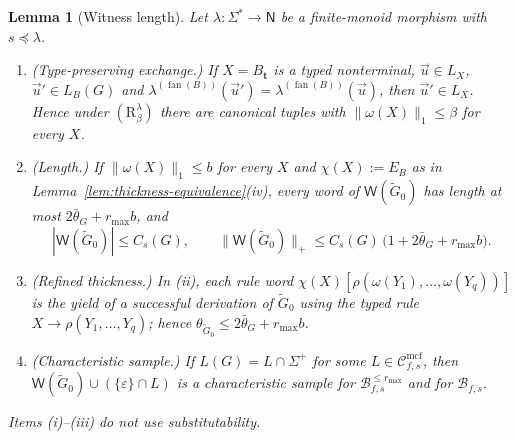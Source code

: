 \documentclass[11pt]{article}
\numberwithin{equation}{section}
\theoremstyle{plain}
\newtheorem{lemma}[theorem]{Lemma}
\theoremstyle{definition}
\theoremstyle{remark}
\newcommand{\Wit}{\mathsf{W}}
\newcommand{\Cmcf}[2]{\mathcal{C}^{\mathrm{mcf}}_{#1,#2}}
\newcommand{\tuple}[1]{\vec{#1}}
\newcommand{\eps}{\varepsilon}
\newcommand{\fan}{\operatorname{fan}}
\begin{document}
\begin{lemma}[Witness length]
\label{lem:witness-length-template}
\label{lem:type-preserving-replacement}
Let $\lambda:\Sigma^*\to\mathsf N$ be a finite-monoid morphism with $s\preceq\lambda$.
\begin{enumerate}[label=\textup{(\roman*)},leftmargin=*]
\item \emph{(Type-preserving exchange.)}  If $X=B_{\mathbf t}$ is a typed
nonterminal, $\tuple u\in L_X$, $\tuple u'\in L_B(G)$ and
$\lambda^{(\fan(B))}(\tuple u')=\lambda^{(\fan(B))}(\tuple u)$, then
$\tuple u'\in L_X$.  Hence under $(\mathrm R_\beta^\lambda)$ there are canonical
tuples with $\|\omega(X)\|_1\le\beta$ for every $X$.
\item \emph{(Length.)}  If $\|\omega(X)\|_1\le b$ for every $X$ and
$\chi(X):=E_B$ as in Lemma~\ref{lem:thickness-equivalence}(iv), every word of
$\Wit(\widetilde G_0)$ has length at most $2\bar\theta_G+r_{\max}b$, and
\[
 |\Wit(\widetilde G_0)|\le C_s(G),\qquad
 \|\Wit(\widetilde G_0)\|_+\le C_s(G)\,\bigl(1+2\bar\theta_G+r_{\max}b\bigr).
\]
\item \emph{(Refined thickness.)}  In (ii), each rule word
$\chi(X)[\rho(\omega(Y_1),\ldots,\omega(Y_q))]$ is the yield of a successful
derivation of $\widetilde G_0$ using the typed rule
$X\to\rho(Y_1,\ldots,Y_q)$; hence $\theta_{\widetilde G_0}\le2\bar\theta_G+r_{\max}b$.
\item \emph{(Characteristic sample.)}  If $L(G)=L\cap\Sigma^+$ for some
$L\in\Cmcf{f}{s}$, then $\Wit(\widetilde G_0)\cup(\{\eps\}\cap L)$ is a
characteristic sample for $\mathcal B^{\le r_{\max}}_{f,s}$ and for
$\mathcal B_{f,s}$.
\end{enumerate}
Items (i)--(iii) do not use substitutability.
\end{lemma}
\end{document}
